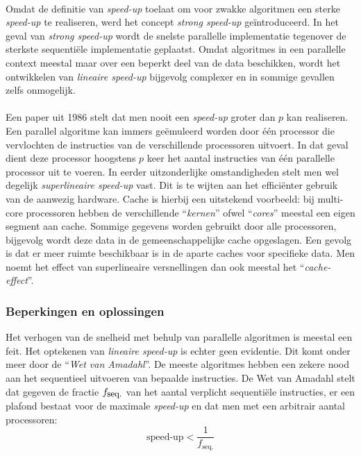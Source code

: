 \paragraph{}
Omdat de definitie van \emph{speed-up} toelaat om voor zwakke algoritmen een sterke \emph{speed-up} te realiseren, werd het concept \emph{strong speed-up} ge\"introduceerd. In het geval van \emph{strong speed-up} wordt de snelste parallelle implementatie tegenover de sterkste sequenti\"ele implementatie geplaatst. Omdat algoritmes in een parallelle context meestal maar over een beperkt deel van de data beschikken, wordt het ontwikkelen van \emph{lineaire speed-up} bijgevolg complexer en in sommige gevallen zelfs onmogelijk.\cite{Alba2005book}

\paragraph{}
Een paper uit 1986\cite{journals/pc/FaberLW86} stelt dat men nooit een \emph{speed-up} groter dan $p$ kan realiseren. Een parallel algoritme kan immers ge\"emuleerd worden door \'e\'en processor die vervlochten de instructies van de verschillende processoren uitvoert. In dat geval dient deze processor hoogstens $p$ keer het aantal instructies van \'e\'en parallelle processor uit te voeren. In eerder uitzonderlijke omstandigheden stelt men wel degelijk \emph{superlineaire speed-up} vast. Dit is te wijten aan het effici\"enter gebruik van de aanwezig hardware. Cache is hierbij een uitstekend voorbeeld: bij multi-core processoren hebben de verschillende ``\emph{kernen}'' ofwel ``\emph{cores}'' meestal een eigen segment aan cache. Sommige gegevens worden gebruikt door alle processoren, bijgevolg wordt deze data in de gemeenschappelijke cache opgeslagen. Een gevolg is dat er meer ruimte beschikbaar is in de aparte caches voor specifieke data. Men noemt het effect van superlineaire versnellingen dan ook meestal het ``\emph{cache-effect}''\cite{cacheEffect,superlineairspeedup,journals/pc/Janssen87,journals/pc/Parkinson86}.

\subsubsection{Beperkingen en oplossingen}

Het verhogen van de snelheid met behulp van parallelle algoritmen is meestal een feit. Het optekenen van \emph{lineaire speed-up} is echter geen evidentie. Dit komt onder meer door de ``\emph{Wet van Amadahl}''\cite{Amdahl:1967:VSP:1465482.1465560}. De meeste algoritmes hebben een zekere nood aan het sequentieel uitvoeren van bepaalde instructies. De Wet van Amadahl stelt dat gegeven de fractie $f_{\mbox{\small{seq.}}}$ van het aantal verplicht sequenti\"ele instructies, er een plafond bestaat voor de maximale \emph{speed-up} en dat men met een arbitrair aantal processoren:
\begin{equation}
\mbox{speed-up}<\displaystyle\frac{1}{f_{\mbox{seq.}}}
\end{equation}


